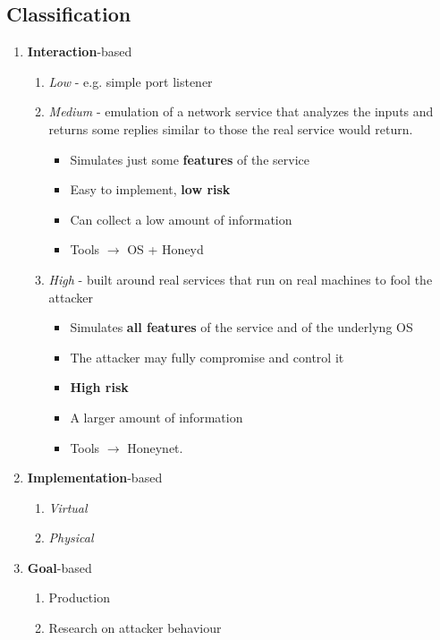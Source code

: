 \subsection{Classification}
\begin{enumerate}
   \item \textbf{Interaction}-based
   \begin{enumerate}
      \item \textit{Low} - e.g. simple port listener
      \item \textit{Medium} - emulation of a network service that analyzes the inputs and returns some replies similar to those the real service would return.
      \begin{itemize}
         \item Simulates just some \textbf{features} of the service
         \item Easy to implement, \textbf{low risk}
         \item Can collect a low amount of information
         \item Tools $\longrightarrow$ OS + Honeyd
      \end{itemize}
      \item \textit{High} - built around real services that run on real machines to fool the attacker
      \begin{itemize}
         \item Simulates \textbf{all features} of the service and of the underlyng OS
         \item The attacker may fully compromise and control it
         \item \textbf{High risk}
         \item A larger amount of information
         \item Tools $\longrightarrow$ Honeynet.
      \end{itemize}
   \end{enumerate}
   
   \item \textbf{Implementation}-based
   \begin{enumerate}
      \item \textit{Virtual}
      \item \textit{Physical}
   \end{enumerate}
   
   \item \textbf{Goal}-based
   \begin{enumerate}
      \item Production
      \item Research on attacker behaviour
   \end{enumerate}
\end{enumerate}

